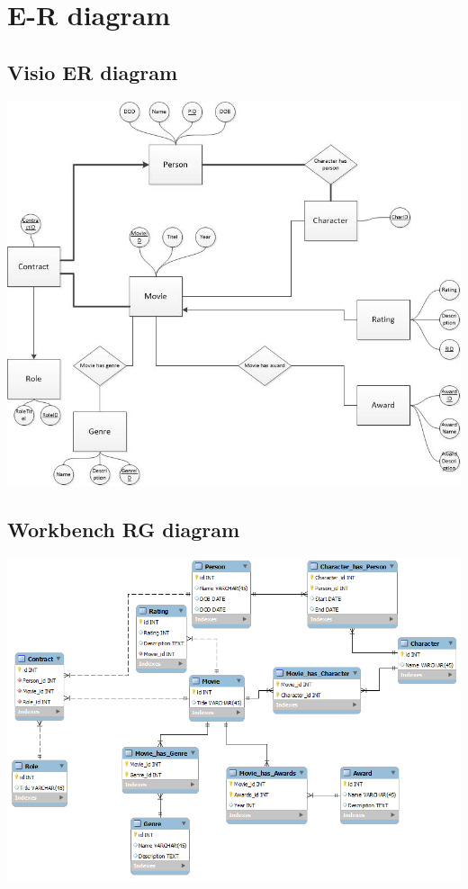 \section{E-R diagram}
\subsection{Visio ER diagram}
\includegraphics[width=\textwidth,natwidth=825,natheight=699]{illustrations/ER.jpg}
\subsection{Workbench RG diagram}
\includegraphics[width=\textwidth,natwidth=940,natheight=670]{illustrations/RG.png}
\newpage
